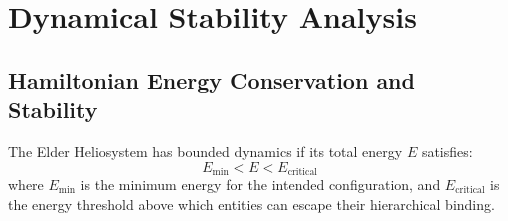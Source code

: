 \section{Dynamical Stability Analysis}

\subsection{Hamiltonian Energy Conservation and Stability}

\begin{theorem}
The Elder Heliosystem has bounded dynamics if its total energy $E$ satisfies:
\begin{equation}
E_{\text{min}} < E < E_{\text{critical}}
\end{equation}
where $E_{\text{min}}$ is the minimum energy for the intended configuration, and $E_{\text{critical}}$ is the energy threshold above which entities can escape their hierarchical binding.
\end{theorem}

